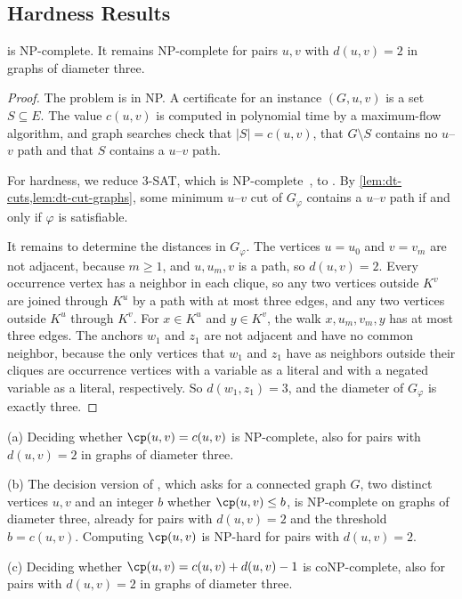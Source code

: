 \subsection{Hardness Results}
\label{sec:dt-results}

\begin{theorem}
\label{thm:dt-hardness}
\PathInMinCut{} is NP-complete.
It remains NP-complete for pairs $u, v$ with $d(u, v) = 2$ in graphs of diameter three.
\end{theorem}

\begin{proof}
The problem is in NP.
A certificate for an instance $(G, u, v)$ is a set $S \subseteq E$.
The value $c(u, v)$ is computed in polynomial time by a maximum-flow algorithm, and graph searches check that $|S| = c(u, v)$, that $G \setminus S$ contains no $u$--$v$ path and that $S$ contains a $u$--$v$ path.

For hardness, we reduce 3-SAT, which is NP-complete~\cite{Cook1971Complexity,Karp1972Reducibility}, to \PathInMinCut{}.
By \cref{lem:dt-cuts,lem:dt-cut-graphs}, some minimum $u$--$v$ cut of $G_\varphi$ contains a $u$--$v$ path if and only if $\varphi$ is satisfiable.

It remains to determine the distances in $G_\varphi$.
The vertices $u = u_0$ and $v = v_m$ are not adjacent, because $m \geq 1$, and $u, u_m, v$ is a path, so $d(u, v) = 2$.
Every occurrence vertex has a neighbor in each clique, so any two vertices outside $K^v$ are joined through $K^u$ by a path with at most three edges, and any two vertices outside $K^u$ through $K^v$.
For $x \in K^u$ and $y \in K^v$, the walk $x, u_m, v_m, y$ has at most three edges.
The anchors $w_1$ and $z_1$ are not adjacent and have no common neighbor, because the only vertices that $w_1$ and $z_1$ have as neighbors outside their cliques are occurrence vertices with a variable as a literal and with a negated variable as a literal, respectively.
So $d(w_1, z_1) = 3$, and the diameter of $G_\varphi$ is exactly three.
\end{proof}

\begin{corollary}
\label{cor:dt-consequences}
(a) Deciding whether $\cp(u, v) = c(u, v)$ is NP-complete, also for pairs with $d(u, v) = 2$ in graphs of diameter three.

(b) The decision version of \MinCutPath{}, which asks for a connected graph $G$, two distinct vertices $u, v$ and an integer $b$ whether $\cp(u, v) \leq b$, is NP-complete on graphs of diameter three, already for pairs with $d(u, v) = 2$ and the threshold $b = c(u, v)$.
Computing $\cp(u, v)$ is NP-hard for pairs with $d(u, v) = 2$.

(c) Deciding whether $\cp(u, v) = c(u, v) + d(u, v) - 1$ is coNP-complete, also for pairs with $d(u, v) = 2$ in graphs of diameter three.
\end{corollary}

